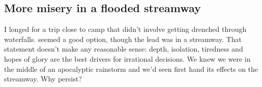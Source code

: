 
\subsection{More misery in a flooded streamway}
I longed for a trip close to camp that didn't involve getting drenched through waterfalls.  seemed a good option, though the lead was in a streamway. That statement doesn't make any reasonable sense: depth, isolation, tiredness and hopes of glory are the best drivers for irrational decisions. We knew we were in the middle of an apocalyptic rainstorm and we'd seen first hand its effects on the  streamway. Why persist?

